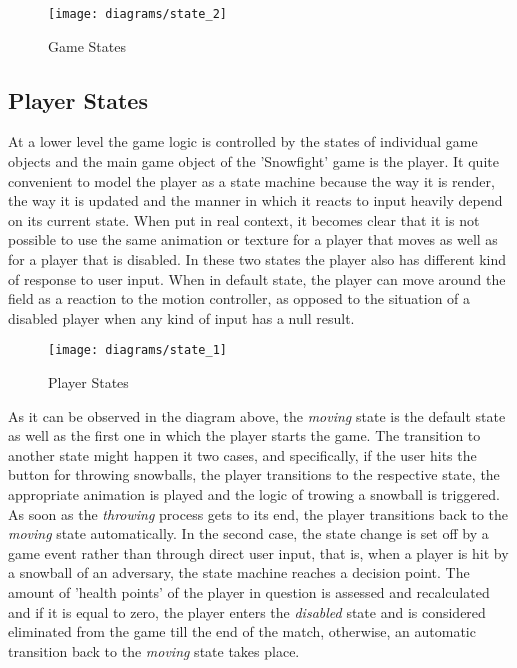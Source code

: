\begin{figure}[!h]
\centering
\texttt{[image: diagrams/state\_2]}
\caption{Game States}\label{diag:state_2}
\end{figure}

\newpage

\subsection{Player States}

At a lower level the game logic is controlled by the states of individual game
objects and the main game object of the 'Snowfight' game is the player. It quite
convenient to model the player as a state machine because the way it is render,
the way it is updated and the manner in which it reacts to input heavily depend
on its current state. When put in real context, it becomes clear that it is not
possible to use the same animation or texture for a player that moves as well as
for a player that is disabled. In these two states the player also has different
kind of response to user input. When in default state, the player can move
around the field as a reaction to the motion controller, as opposed to the
situation of a disabled player when any kind of input has a null result.

\begin{figure}[!h]
\centering
\texttt{[image: diagrams/state\_1]}
\caption{Player States}\label{diag:state_1}
\end{figure}

As it can be observed in the diagram above, the \emph{moving} state is the
default state as well as the first one in which the player starts the game. The
transition to another state might happen it two cases, and specifically, if the
user hits the button for throwing snowballs, the player transitions to the
respective state, the appropriate animation is played and the logic of trowing a
snowball is triggered. As soon as the \emph{throwing} process gets to its end,
the player transitions back to the \emph{moving} state automatically. In the
second case, the state change is set off by a game event rather than through
direct user input, that is, when a player is hit by a snowball of an adversary,
the state machine reaches a decision point. The amount of 'health points' of the
player in question is assessed and recalculated and if it is equal to zero, the
player enters the \emph{disabled} state and is considered eliminated from the
game till the end of the match, otherwise, an automatic transition back to the
\emph{moving} state takes place.

